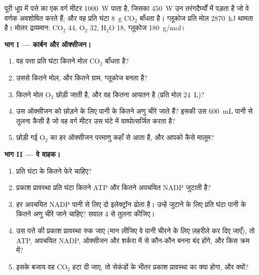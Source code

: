 \begin{problem}[{सप्ताहांत समस्या --- धूप की ऊर्जा का पीछा शर्करा तक:
फ़ोटॉन गिने गए, वाहकों का हिसाब हुआ, ऑक्सीजन तथा कार्बन संतुलित हुए, और
किसी पत्ते की दक्षता निकाली गई}]
\label{pb:g12:photosynthesis:1}
पूरी धूप में पत्ते का एक वर्ग मीटर \qty{1000}{W} पाता है, जिसका
\qty{450}{W} उन तरंगदैर्घ्यों में पड़ता है जो वे वर्णक अवशोषित करते हैं; और
वह प्रति घंटा \qty{8}{g} $\mathrm{CO_2}$ बाँधता है। ग्लूकोज प्रति मोल
\qty{2870}{kJ} थामता है। मोलर द्रव्यमान: $\mathrm{CO_2}$ 44, $\mathrm{O_2}$ 32,
$\mathrm{H_2O}$ 18, ग्लूकोज \qty{180}{g/mol}।

\medskip
\noindent\textbf{भाग I --- कार्बन और ऑक्सीजन।}
\begin{enumerate}
  \item वह पत्ता प्रति घंटा कितने मोल $\mathrm{CO_2}$ बाँधता है?
  \item उससे कितने मोल, और कितने ग्राम, ग्लूकोज बनता है?
  \item कितने मोल $\mathrm{O_2}$ छोड़ी जाती है, और वह कितना आयतन है
        (प्रति मोल \qty{24}{L})?
  \item उस ऑक्सीजन को छोड़ने के लिए पानी के कितने अणु चीरे जाते हैं? इसकी
        उस \qty{600}{mL} पानी से तुलना कैसी है जो वह वर्ग मीटर उस घंटे में
        वाष्पोत्सर्जित करता है?
  \item छोड़ी गई $\mathrm{O_2}$ का हर ऑक्सीजन परमाणु कहाँ से आता है, और
        आपको कैसे मालूम?
\end{enumerate}

\medskip
\noindent\textbf{भाग II --- वे वाहक।}
\begin{enumerate}[resume]
  \item प्रति घंटा  के कितने फेरे चाहिए?
  \item प्रकाश प्रावस्था प्रति घंटा कितने ATP और कितने अपचयित NADP जुटाती
        है?
  \item हर अपचयित NADP पानी से लिए दो इलेक्ट्रॉन ढोता है। उन्हें जुटाने के
        लिए प्रति घंटा पानी के कितने अणु चीरे जाने चाहिए? सवाल 4 से तुलना
        कीजिए।
  \item उस पत्ते की प्रकाश प्रावस्था रुक जाए (मान लीजिए वे  पानी
        चीरने के लिए ज़हरीले कर दिए जाएँ), तो ATP, अपचयित NADP, ऑक्सीजन और
        शर्करा में से कौन-कौन बनना बंद होंगे, और किस क्रम में?
  \item इसके बजाय वह $\mathrm{CO_2}$ हटा दी जाए, तो सेकंडों के भीतर प्रकाश
        प्रावस्था का क्या होगा, और क्यों?
\end{enumerate}


\end{problem}

